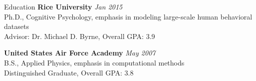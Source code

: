  
\begin{rSection}{Education}
  {\bf Rice University} \hfill {\em Jan 2015} \\
  Ph.D., Cognitive Psychology, emphasis in modeling large-scale human behavioral datasets \\
  Advisor: Dr. Michael D. Byrne, Overall GPA: 3.9
\item {\bf United States Air Force Academy} \hfill {\em May 2007} \\ 
  B.S., Applied Physics, emphasis in computational methods \\
  Distinguished Graduate, Overall GPA: 3.8 
\end{rSection}

